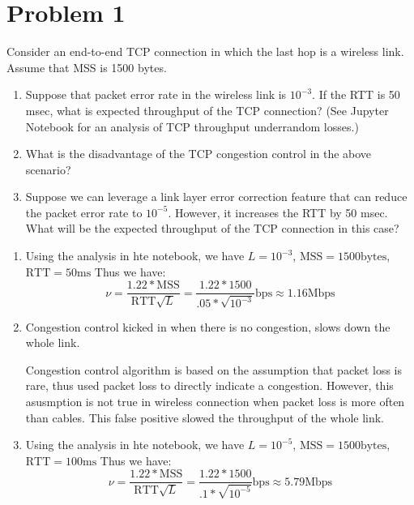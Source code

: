 \section*{Problem 1}

Consider an end-to-end TCP connection in which the last hop is a wireless link.
Assume that MSS is 1500 bytes.
\begin{enumerate}
      \item  Suppose that packet error rate in the wireless link is $10^{-3}$.
            If the RTT is 50 msec, what is expected throughput of the TCP connection?
            (See Jupyter Notebook for an analysis of TCP throughput underrandom losses.)
      \item  What is the disadvantage of the TCP congestion control in the above scenario?
      \item  Suppose we can leverage a link layer error correction feature that can reduce the packet error rate to $10^{-5}$.
            However, it increases the RTT by 50 msec.
            What will be the expected throughput of the TCP connection in this case?
\end{enumerate}

\begin{enumerate}
      \item Using the analysis in hte notebook, we have $L = 10^{-3}$, $\text{MSS} = 1500 \text{bytes}$, $\text{RTT} = 50 \text{ms}$
            Thus we have:
            $$ \nu = \frac{1.22 * \text{MSS}}{\text{RTT} \sqrt{L}} = \frac{1.22 * 1500}{.05 * \sqrt{10^{-3}}} \text{bps} \approx 1.16 \text{Mbps}$$

      \item Congestion control kicked in when there is no congestion, slows down the whole link.

            Congestion control algorithm is based on the assumption that packet loss is rare, thus used packet loss to directly indicate a congestion.
            However, this asusmption is not true in wireless connection when packet loss is more often than cables.
            This false positive slowed the throughput of the whole link.

      \item Using the analysis in hte notebook, we have $L = 10^{-5}$, $\text{MSS} = 1500 \text{bytes}$, $\text{RTT} = 100 \text{ms}$
            Thus we have:
            $$ \nu = \frac{1.22 * \text{MSS}}{\text{RTT} \sqrt{L}} = \frac{1.22 * 1500}{.1 * \sqrt{10^{-5}}} \text{bps} \approx 5.79 \text{Mbps}$$

\end{enumerate}